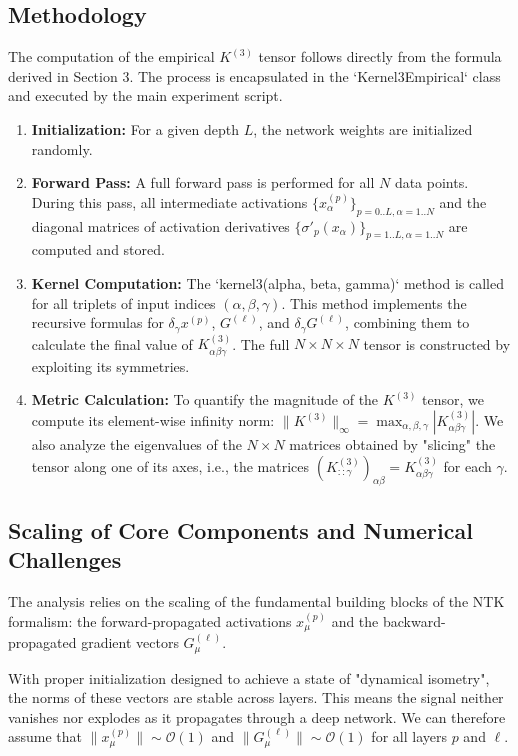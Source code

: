 \documentclass{article}
\newcommand{\Order}{\mathcal{O}}
\begin{document}
\subsection{Methodology}

The computation of the empirical $K^{(3)}$ tensor follows directly from the formula derived in Section 3. The process is encapsulated in the `Kernel3Empirical` class and executed by the main experiment script.

\begin{enumerate}
    \item \textbf{Initialization:} For a given depth $L$, the network weights are initialized randomly.
    \item \textbf{Forward Pass:} A full forward pass is performed for all $N$ data points. During this pass, all intermediate activations $\{x^{(p)}_\alpha\}_{p=0..L, \alpha=1..N}$ and the diagonal matrices of activation derivatives $\{\sigma'_p(x_\alpha)\}_{p=1..L, \alpha=1..N}$ are computed and stored.
    \item \textbf{Kernel Computation:} The `kernel3(alpha, beta, gamma)` method is called for all triplets of input indices $(\alpha, \beta, \gamma)$. This method implements the recursive formulas for $\delta_\gamma x^{(p)}$, $G^{(\ell)}$, and $\delta_\gamma G^{(\ell)}$, combining them to calculate the final value of $K^{(3)}_{\alpha\beta\gamma}$. The full $N \times N \times N$ tensor is constructed by exploiting its symmetries.
    \item \textbf{Metric Calculation:} To quantify the magnitude of the $K^{(3)}$ tensor, we compute its element-wise infinity norm: $\|K^{(3)}\|_\infty = \max_{\alpha,\beta,\gamma} |K^{(3)}_{\alpha\beta\gamma}|$. We also analyze the eigenvalues of the $N \times N$ matrices obtained by "slicing" the tensor along one of its axes, i.e., the matrices $(K^{(3)}_{::\gamma})_{\alpha\beta} = K^{(3)}_{\alpha\beta\gamma}$ for each $\gamma$.
\end{enumerate}


\subsection{Scaling of Core Components and Numerical Challenges}

The analysis relies on the scaling of the fundamental building blocks of the NTK formalism: the forward-propagated activations $x^{(p)}_\mu$ and the backward-propagated gradient vectors $G^{(\ell)}_\mu$.

With proper initialization designed to achieve a state of "dynamical isometry", the norms of these vectors are stable across layers. This means the signal neither vanishes nor explodes as it propagates through a deep network. We can therefore assume that $\|x^{(p)}_\mu\| \sim \Order(1)$ and $\|G^{(\ell)}_\mu\| \sim \Order(1)$ for all layers $p$ and $\ell$.
\end{document}
